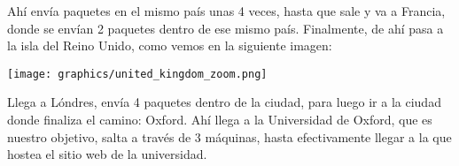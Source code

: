 Ahí envía paquetes en el mismo país unas 4 veces, hasta que sale y va a Francia, donde se envían 2 paquetes dentro de ese mismo país. Finalmente, de ahí pasa a la isla del Reino Unido, como vemos en la siguiente imagen:

\begin{center}
	\texttt{[image: graphics/united\_kingdom\_zoom.png]}
\end{center}

Llega a Lóndres, envía 4 paquetes dentro de la ciudad, para luego ir a la ciudad donde finaliza el camino: Oxford. Ahí llega a la Universidad de Oxford, que es nuestro objetivo, salta a través de 3 máquinas, hasta efectivamente llegar a la que hostea el sitio web de la universidad.